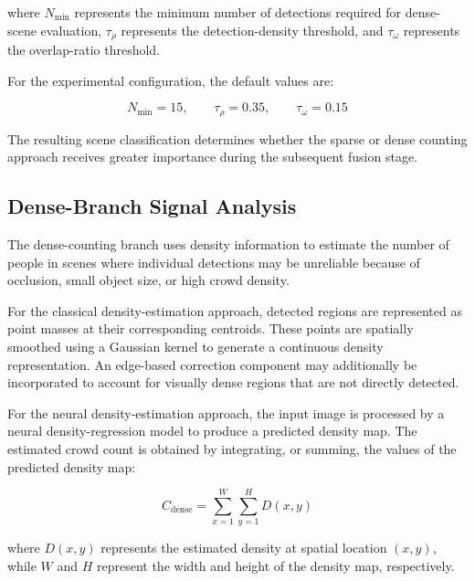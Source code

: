 \documentclass[12pt,a4paper]{report}
\begin{document}
where $N_{\min}$ represents the minimum number of detections required for
dense-scene evaluation, $\tau_{\rho}$ represents the detection-density
threshold, and $\tau_{\omega}$ represents the overlap-ratio threshold.

For the experimental configuration, the default values are:

\begin{equation}
N_{\min}=15,\qquad
\tau_{\rho}=0.35,\qquad
\tau_{\omega}=0.15
\label{eq:density-thresholds}
\end{equation}

The resulting scene classification determines whether the sparse or dense
counting approach receives greater importance during the subsequent fusion
stage.


\subsection{Dense-Branch Signal Analysis}

The dense-counting branch uses density information to estimate the number of
people in scenes where individual detections may be unreliable because of
occlusion, small object size, or high crowd density.

For the classical density-estimation approach, detected regions are
represented as point masses at their corresponding centroids. These points
are spatially smoothed using a Gaussian kernel to generate a continuous
density representation. An edge-based correction component may additionally
be incorporated to account for visually dense regions that are not directly
detected.

For the neural density-estimation approach, the input image is processed by
a neural density-regression model to produce a predicted density map. The
estimated crowd count is obtained by integrating, or summing, the values of
the predicted density map:

\begin{equation}
C_{\mathrm{dense}}
=
\sum_{x=1}^{W}
\sum_{y=1}^{H}
D(x,y)
\label{eq:dense-count}
\end{equation}

where $D(x,y)$ represents the estimated density at spatial location
$(x,y)$, while $W$ and $H$ represent the width and height of the density
map, respectively.


\end{document}
